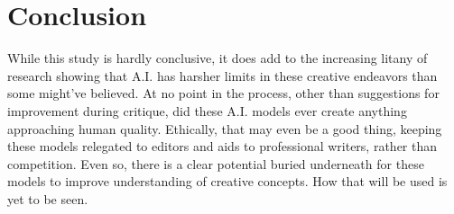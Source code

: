 \documentclass[sigconf]{acmart}
\begin{document}
\section{Conclusion}
While this study is hardly conclusive, it does add to the increasing litany of research showing that A.I. has harsher limits in these creative endeavors than some might've believed. At no point in the process, other than suggestions for improvement during critique, did these A.I. models ever create anything approaching human quality. Ethically, that may even be a good thing, keeping these models relegated to editors and aids to professional writers, rather than competition. Even so, there is a clear potential buried underneath for these models to improve understanding of creative concepts. How that will be used is yet to be seen.



\end{document}
